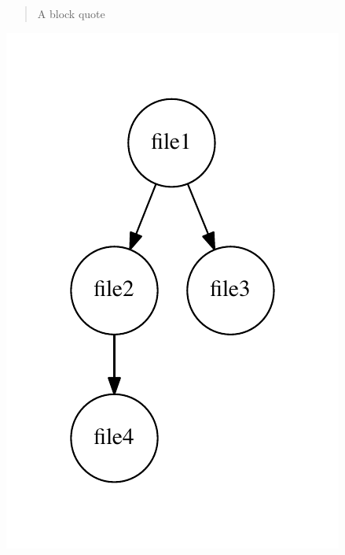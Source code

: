 \begin{quote}
A block quote \end{quote}



\begin{DoxyImageNoCaption}
  \mbox{\includegraphics[width=\textwidth,height=\textheight/2,keepaspectratio=true]{dot_grap2}}
\end{DoxyImageNoCaption}
 